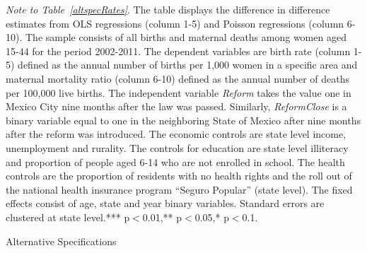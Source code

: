 \documentclass[a4paper, 11pt]{article}
\begin{document}
\begin{spacing}{1.4}
\begin{table}
\begin{threeparttable}
    \begin{tablenotes} 
      \footnotesize	\item \textit{Note to Table~\ref{altspecRates}}. The table displays the difference in difference estimates from OLS regressions (column 1-5) and Poisson regressions (column 6-10). The sample consists of all births and maternal deaths among women aged 15-44 for the period 2002-2011. The dependent variables are birth rate (column 1-5) defined as the annual number of births per 1,000 women in a specific area and maternal mortality ratio (column 6-10) defined as the annual number of deaths per 100,000 live births. The independent variable \textit{Reform} takes the value one in Mexico City nine months after the law was passed. Similarly, \textit{ReformClose} is a binary variable equal to one in the neighboring State of Mexico after nine months after the reform was introduced. The economic controls are state level income, unemployment and rurality. The controls for education are state level illiteracy and proportion of people aged 6-14 who are not enrolled in school. The health controls are the proportion of residents with no health rights and the roll out of the national health insurance program ``Seguro Popular'' (state level). The fixed effects consist of age, state and year binary variables. Standard errors are clustered at state level.*** p$<$0.01,** p$<$0.05,* p$<$0.1.
      
       
    \end{tablenotes} 
  \end{threeparttable}
\end{table} 



\begin{table}\centering \caption{Alternative Specifications}\label{OLS_levels}
	\begin{threeparttable}
	{ \footnotesize	}
	 
		
	

\end{threeparttable}
\end{table}
\end{spacing}
\end{document}
